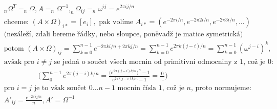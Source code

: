 \documentclass[a4paper]{article}
\newcommand{\tab}{\hspace{1cm}}
\begin{document}
\begin{align*}
	& _n\Omega^T = _n\Omega, A = _n\Omega^{-1}, _n\Omega_{ij} = _n\omega^{ij} =  e^{2\pi ij/n } \\
	& \text{chceme: } (A \times \Omega)_{i*} = [e_i], \text{ pak volíme } A_{i*} = (e^{-2\pi i/n}, e^{-2\pi 2 i/n}, e^{-2\pi 3 i/n}, \ldots) \\
	& \text{(nezáleží, zdali bereme řádky, nebo sloupce, poněvadž je matice symetrická)} \\
	& \text{potom } (A \times \Omega)_{ij} = \sum_{k=0}^{n-1} e^{-2\pi k i/n + 2\pi k j/n} = \sum_{k=0}^{n-1} e^{2\pi k (j-i)/n} = \sum_{k=0}^{n-1} (\omega^{j-i})^k, \\
	& \text{avšak pro $i\ne j$ se jedná o součet všech mocnin od primitivní odmocniny z $1$, což je $0$:} \\
	& \tab \tab \Bigg( \sum_0^{n-1} e^{2\pi (j-i) k/n} = \frac{\bigg(e^{2\pi (j-i) k/n}\bigg)^n-1}{e^{2\pi (j-i) k/n}-1} = \frac{0}{\ldots} \Bigg) \\
	& \text{pro $i = j$ je to však součet $0 \ldots n-1$ mocnin čísla $1$, což je $n$, proto normujeme: } \\
	& A'_{ij} = \frac{e^{-2\pi ij/n}}{n}, A' = \Omega^{-1}
\end{align*}
\end{document}
